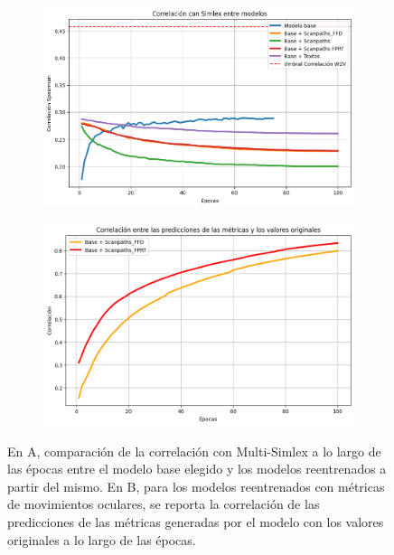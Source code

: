 \label{sec:reentrenamiento}
\begin{figure}[htb]
    \centering
    \begin{subfigure}[b]{0.45\textwidth}
        \centering
        \includegraphics[width=1\textwidth]{imagenes/corr_reentrenamiento.png}
        \caption{}
        \label{fig:corr_reentrenamiento.png}
    \end{subfigure}
    \hfill
    \begin{subfigure}[b]{0.45\textwidth}
        \centering
        \includegraphics[width=1\textwidth]{imagenes/corr_pred_reentrenamiento.png}
        \caption{}
        \label{fig:corr_pred_reentrenamiento.png}
    \end{subfigure}
    \caption{En A, comparación de la correlación con Multi-Simlex a lo largo de las 
    épocas entre el modelo base elegido y los modelos reentrenados a partir del 
    mismo. En B, para los modelos reentrenados con métricas de movimientos 
    oculares, se reporta la correlación de las predicciones de las métricas 
    generadas por el modelo con los valores originales a lo largo de las épocas.}
    \label{fig:simlex_reentrenamiento}
\end{figure}

